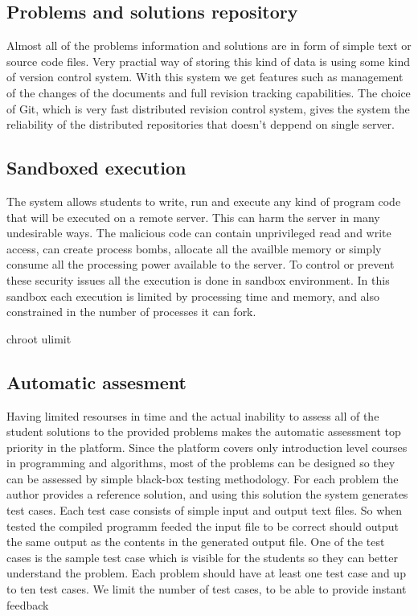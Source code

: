 \documentclass{article}
\begin{document}
\subsection{Problems and solutions repository}
Almost all of the problems information and solutions are in form of simple text
or source code files. Very practial way of storing this kind of data is using
some kind of version control system. With this system we get features such as
management of the changes of the documents and full revision tracking
capabilities. The choice of Git, which is very fast distributed revision control
system, gives the system the reliability of the distributed repositories that
doesn't deppend on single server.

\subsection{Sandboxed execution}
The system allows students to write, run and execute any kind of program code
that will be executed on a remote server. This can harm the server in many
undesirable ways. The malicious code can contain unprivileged read and write
access, can create process bombs, allocate all the availble memory or simply
consume all the processing power available to the server. To control or prevent
these security issues all the execution is done in sandbox environment. In this
sandbox each execution is limited by processing time and memory, and also
constrained in the number of processes it can fork.

chroot
ulimit

\subsection{Automatic assesment}
Having limited resourses in time and the actual inability to assess all of the
student solutions to the provided problems makes the automatic assessment
top priority in the platform. Since the platform covers only introduction level
courses in programming and algorithms, most of the problems can be designed so
they can be assessed by simple black-box testing methodology. For each problem
the author provides a reference solution, and using this solution the system
generates test cases. Each test case consists of simple input and output text
files. So when tested the compiled programm feeded the input file to be correct
should output the same output as the contents in the generated output file. One
of the test cases is the sample test case which is visible for the students so
they can better understand the problem. Each problem should have at least one
test case and up to ten test cases. We limit the number of test cases, to be
able to provide instant feedback
\end{document}
